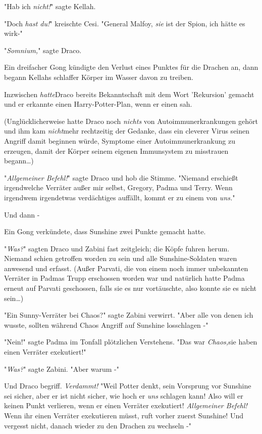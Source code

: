 {"Hab ich \emph{nicht!}" sagte Kellah.

"Doch \emph{hast du!}" kreischte Cesi. "General Malfoy, \emph{sie} ist der Spion, ich hätte es wirk-"

"\emph{Somnium,}" sagte Draco.

Ein dreifacher Gong kündigte den Verlust eines Punktes für die Drachen an, dann begann Kellahs schlaffer Körper im Wasser davon zu treiben.

Inzwischen \emph{hatte}Draco bereits Bekanntschaft mit dem Wort 'Rekursion' gemacht und er erkannte einen Harry-Potter-Plan, wenn er einen sah.

(Unglücklicherweise hatte Draco noch \emph{nichts} von Autoimmunerkrankungen gehört und ihm kam \emph{nicht}mehr rechtzeitig der Gedanke, dass ein cleverer Virus seinen Angriff damit beginnen würde, Symptome einer Autoimmunerkrankung zu erzeugen, damit der Körper seinem eigenen Immunsystem zu misstrauen begann…)

"\emph{Allgemeiner Befehl!}" sagte Draco und hob die Stimme. "Niemand erschießt irgendwelche Verräter außer mir selbst, Gregory, Padma und Terry. Wenn irgendwem irgendetwas verdächtiges auffällt, kommt er zu einem von \emph{uns.}"

Und dann -

Ein Gong verkündete, dass Sunshine zwei Punkte gemacht hatte.

"\emph{Was?}" sagten Draco und Zabini fast zeitgleich; die Köpfe fuhren herum. Niemand schien getroffen worden zu sein und alle Sunshine-Soldaten waren anwesend und erfasst. (Außer Parvati, die von einem noch immer unbekannten Verräter in Padmas Trupp erschossen worden war und natürlich hatte Padma erneut auf Parvati geschossen, falls sie es nur vortäuschte, also konnte sie es nicht sein…)

"Ein Sunny-Verräter bei Chaos?" sagte Zabini verwirrt. "Aber alle von denen ich wusste, sollten während Chaos Angriff auf Sunshine losschlagen -"

"Nein!" sagte Padma im Tonfall plötzlichen Verstehens. "Das war \emph{Chaos,}sie haben einen Verräter exekutiert!"

"\emph{Was?}" sagte Zabini. "Aber warum -"

Und Draco begriff. \emph{Verdammt!} "Weil Potter denkt, sein Vorsprung vor Sunshine sei sicher, aber er ist nicht sicher, wie hoch er \emph{uns} schlagen kann! Also will er keinen Punkt verlieren, wenn er einen Verräter exekutiert! \emph{Allgemeiner Befehl!} Wenn ihr einen Verräter exekutieren müsst, ruft vorher zuerst Sunshine! Und vergesst nicht, danach wieder zu den Drachen zu wechseln -"

}
